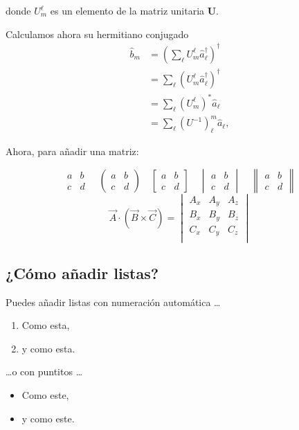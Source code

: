 \documentclass[a4paper]{article}
\begin{document}
donde $U_{m}^{\ell}$ es un elemento de la matriz unitaria $\mathbf{U}$.

Calculamos ahora su hermitiano conjugado
\begin{align}
\hat{b}_{m} & =\left(\sum_{\ell}U_{m}^{\ell}\hat{a}_{\ell}^{\dagger}\right)^{\dagger}\label{eq:bm}\\
 & =\sum_{\ell}\left(U_{m}^{\ell}\hat{a}_{\ell}^{\dagger}\right)^{\dagger}\nonumber \\
 & =\sum_{\ell}\left(U_{m}^{\ell}\right)^{*}\hat{a}_{\ell}\nonumber \\
 & =\sum_{\ell}\left(U^{-1}\right)_{\ell}^{m}\hat{a}_{\ell},\label{eq:bSubM}
\end{align}

Ahora, para añadir una matriz:

$$
\begin{matrix} 
a & b \\
c & d 
\end{matrix}
\quad
\begin{pmatrix} 
a & b \\
c & d 
\end{pmatrix}
\quad
\begin{bmatrix} 
a & b \\
c & d 
\end{bmatrix}
\quad
\begin{vmatrix} 
a & b \\
c & d 
\end{vmatrix}
\quad
\begin{Vmatrix} 
a & b \\
c & d 
\end{Vmatrix}
$$
\begin{equation}
\vec{A}\cdot(\vec{B}\times\vec{C})=\begin{vmatrix}
A_x&A_y&A_z\\
B_x&B_y&B_z\\
C_x&C_y&C_z\\
\end{vmatrix}
\end{equation}

\subsection{¿Cómo añadir listas?}

Puedes añadir listas con numeración automática \dots

\begin{enumerate}
\item Como esta,
\item y como esta.
\end{enumerate}
\dots o con puntitos \dots
\begin{itemize}
\item Como este,
\item y como este.
\end{itemize}
\end{document}
